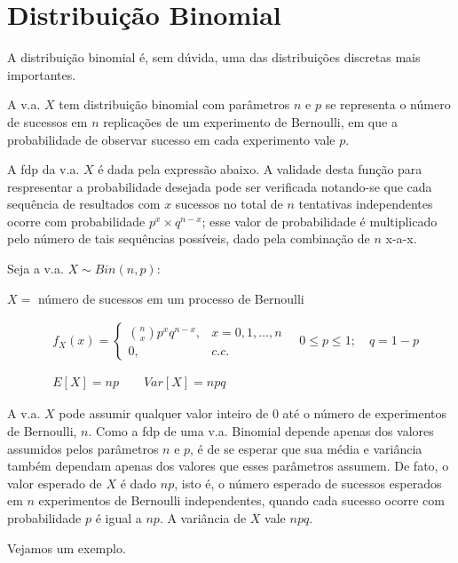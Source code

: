 \documentclass[
]{book}
\theoremstyle{definition}
\theoremstyle{definition}
\theoremstyle{definition}
\theoremstyle{remark}
\begin{document}
\hypertarget{distribuiuxe7uxe3o-binomial}{%
\section{Distribuição Binomial}\label{distribuiuxe7uxe3o-binomial}}

A distribuição binomial é, sem dúvida, uma das distribuições discretas mais importantes.

A v.a. \(X\) tem distribuição binomial com parâmetros \(n\) e \(p\) se
representa o número de sucessos em \(n\) replicações de um experimento de Bernoulli, em que a probabilidade de observar sucesso em cada experimento vale \(p\).

A fdp da v.a. \(X\) é dada pela expressão abaixo. A validade desta função para respresentar a probabilidade desejada pode ser verificada notando-se que cada sequência de resultados com \(x\) sucessos no total de \(n\) tentativas independentes ocorre com probabilidade \(p^x \times q^{n-x}\); esse valor de probabilidade é multiplicado pelo número de tais sequências possíveis, dado pela combinação de \(n\) x-a-x.

Seja a v.a. \(X \sim \mathit{Bin} (n,p)\):

\(X =\) número de sucessos em um processo de Bernoulli

\begin{align*}
  &{} f_{X}(x) = \left\{
  \begin{array}{rl}
    \binom{n}{x}p^x q^{n-x}, & x = 0, 1, \ldots, n\\
    0,           & c.c.
  \end{array}\right.
  \quad 0 \leq p \leq 1; \quad q=1-p \\
  \\ \\
  &{} E[X] = np \qquad Var[X] = npq
\end{align*}

A v.a. \(X\) pode assumir qualquer valor inteiro de 0 até o número de experimentos de Bernoulli, \(n\). Como a fdp de uma v.a. Binomial depende apenas dos valores assumidos pelos parâmetros \(n\) e \(p\), é de se esperar que sua média e variância também dependam apenas dos valores que esses parâmetros assumem. De fato, o valor esperado de \(X\) é dado \(np\), isto é, o número esperado de sucessos esperados em \(n\) experimentos de Bernoulli independentes, quando cada sucesso ocorre com probabilidade \(p\) é igual a \(np\). A variância de \(X\) vale \(npq\).

Vejamos um exemplo.
\end{document}
